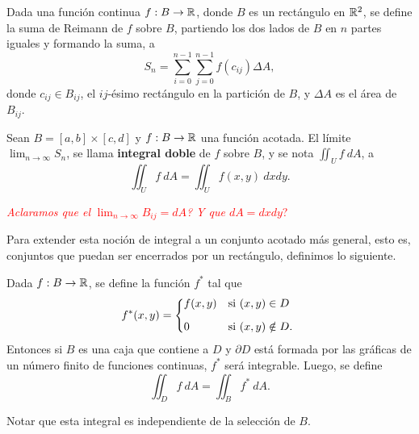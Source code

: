 \begin{definition}
Dada una funci\'on continua $f:B\to\mathbb{R}$, donde $B$ es un rect\'angulo en $\mathbb{R}^2$, se define la suma de Reimann de $f$ sobre $B$, partiendo los dos lados de $B$ en $n$ partes iguales y formando la suma, a
\[
    S_n=\sum_{i=0}^{n-1}\sum_{j=0}^{n-1} f(c_{ij})\Delta A,
\]  
donde $c_{ij}\in B_{ij}$, el $ij$-\'esimo rect\'angulo en la partici\'on de $B$, y $\Delta A$ es el \'area de $B_{ij}$.
\end{definition}

\begin{definition} 
    Sean $B=[a,b]\times[c,d]$ y $f:B\to\mathbb{R}$ una funci\'on acotada. El l\'imite $\lim_{n\to\infty}S_n$, se llama \textbf{integral doble} de $f$ sobre $B$, y se nota $\iint_U f\:dA$, a
    \[
          \iint_U f\:dA=\iint_U f(x,y)\:dxdy.
    \]
\end{definition}

\textcolor{red}{\textit{Aclaramos que el} $\lim_{n\to\infty}B_{ij}=dA$\textit{? Y que $dA=dxdy$}?}

Para extender esta noci\'on de integral a un conjunto acotado m\'as general, esto es, conjuntos que puedan ser encerrados por un rect\'angulo, definimos lo siguiente. 

\begin{definition}
Dada $f:B\to\mathbb{R}$, se define la funci\'on $f^*$ tal que
\[
    f^*(x,y)=
    \begin{dcases*}
        f(x,y) & si $(x,y)\in D$ \\[.2cm]
        0        & si $(x,y)\notin D.$
    \end{dcases*}
\]
Entonces si $B$ es una caja que contiene a $D$ y $\partial D$ est\'a formada por las gr\'aficas de un n\'umero finito de funciones continuas, $f^*$ ser\'a integrable. Luego, se define
\[
    \iint_D f\:dA=\iint_B f^*\:dA.  
\]
\end{definition}

\begin{obs} 
    Notar que esta integral es independiente de la selecci\'on de $B$.
\end{obs}

